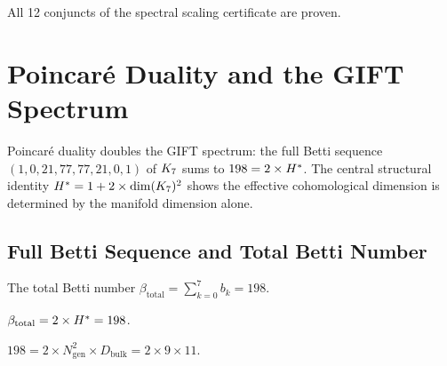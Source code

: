\begin{theorem}\label{thm:spectral_scaling_cert}
    \leanok
    All 12 conjuncts of the spectral scaling certificate are proven.
\end{theorem}


\chapter{Poincar\'e Duality and the GIFT Spectrum}\label{chap:poincare_duality}

Poincar\'e duality doubles the GIFT spectrum: the full Betti sequence
$(1, 0, 21, 77, 77, 21, 0, 1)$ of $K_7$ sums to $198 = 2 \times H^*$.
The central structural identity $H^* = 1 + 2 \times \mathrm{dim}(K_7)^2$
shows the effective cohomological dimension is determined by the manifold
dimension alone.

\section{Full Betti Sequence and Total Betti Number}

\begin{definition}\label{def:total_betti}
    \leanok
    The total Betti number $\beta_{\mathrm{total}} = \sum_{k=0}^{7} b_k = 198$.
\end{definition}

\begin{theorem}\label{thm:total_betti_doubled}
    \leanok
    $\beta_{\mathrm{total}} = 2 \times H^* = 198$.
\end{theorem}

\begin{theorem}\label{thm:total_betti_factored}
    \leanok
    $198 = 2 \times N_{\mathrm{gen}}^2 \times D_{\mathrm{bulk}} = 2 \times 9 \times 11$.
\end{theorem}

